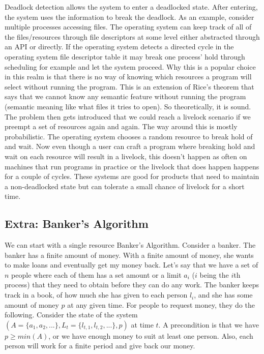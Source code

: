 Deadlock detection allows the system to enter a deadlocked state.
After entering, the system uses the information to break the deadlock.
As an example, consider multiple processes accessing files.
The operating system can keep track of all of the files/resources through file descriptors at some level either abstracted through an API or directly.
If the operating system detects a directed cycle in the operating system file descriptor table it may break one process' hold through scheduling for example and let the system proceed.
Why this is a popular choice in this realm is that there is no way of knowing which resources a program will select without running the program.
This is an extension of Rice's theorem \cite{rice} that says that we cannot know any semantic feature without running the program (semantic meaning like what files it tries to open).
So theoretically, it is sound.
The problem then gets introduced that we could reach a livelock scenario if we preempt a set of resources again and again.
The way around this is mostly probabilistic.
The operating system chooses a random resource to break hold of and wait.
Now even though a user can craft a program where breaking hold and wait on each resource will result in a livelock, this doesn't happen as often on machines that run programs in practice or the livelock that does happen happens for a couple of cycles.
These systems are good for products that need to maintain a non-deadlocked state but can tolerate a small chance of livelock for a short time.

\subsection{Extra: Banker's Algorithm}

We can start with a single resource Banker's Algorithm.
Consider a banker.
The banker has a finite amount of money.
With a finite amount of money, she wants to make loans and eventually get my money back.
Let's say that we have a set of $n$ people where each of them has a set amount or a limit $a_i$ ($i$ being the $i$th process) that they need to obtain before they can do any work.
The banker keeps track in a book, of how much she has given to each person $l_i$, and she has some amount of money $p$ at any given time.
For people to request money, they do the following.
Consider the state of the system $(A=\{a_1, a_2, ...\}, L_t=\{l_{t,1}, l_{t,2}, ...\}, p)$ at time $t$.
A precondition is that we have $p \geq min(A)$, or we have enough money to suit at least one person.
Also, each person will work for a finite period and give back our money.

